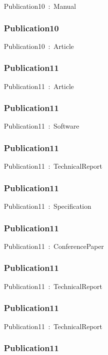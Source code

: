 \documentclass{article}
\begin{document}
Publication10~:~Manual

\subsubsection*{Publication10}

Publication10~:~Article

\subsubsection*{Publication11}

Publication11~:~Article

\subsubsection*{Publication11}

Publication11~:~Software

\subsubsection*{Publication11}

Publication11~:~TechnicalReport

\subsubsection*{Publication11}

Publication11~:~Specification

\subsubsection*{Publication11}

Publication11~:~ConferencePaper

\subsubsection*{Publication11}

Publication11~:~TechnicalReport

\subsubsection*{Publication11}

Publication11~:~TechnicalReport

\subsubsection*{Publication11}
\end{document}
